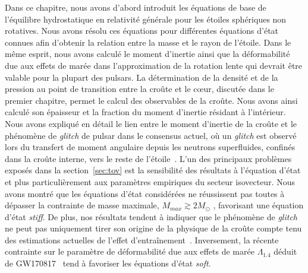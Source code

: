 Dans ce chapitre, nous avons d'abord introduit les équations de base de
l'équilibre hydrostatique en relativité générale pour les étoiles sphériques 
non rotatives. Nous avons résolu ces équations pour différentes équations 
d'état connues afin d'obtenir la relation entre la masse et le rayon de 
l'étoile. 
Dans le même esprit, nous avons calculé le moment d'inertie ainsi que la 
déformabilité due aux effets de marée dans l'approximation de la rotation 
lente qui devrait être valable pour la plupart des pulsars. 
La détermination de la densité et de la pression au point de transition entre
la croûte et le c\oe ur, discutée dans le premier chapitre, permet le calcul 
des observables de la croûte. Nous avons ainsi calculé son épaisseur et 
la fraction du moment d'inertie résidant à l'intérieur. Nous 
avons expliqué en détail le lien entre le moment d'inertie de la croûte et le 
phénomène de \textit{glitch} de pulsar dans le consensus actuel, où un 
\textit{glitch} est observé lors du transfert de moment angulaire depuis 
les neutrons superfluides, confinés dans la croûte interne, vers le reste de 
l'étoile~\cite{Anderson1975}. 
%
L'un des principaux problèmes exposés dans la section~\ref{sec:tov} est la 
sensibilité des résultats à l'équation d'état et plus particulièrement aux
paramètres empiriques du secteur isovecteur. Nous avons montré que les 
équations d'état considérées ne réussissent pas toutes à dépasser la 
contrainte de masse maximale, $M_{max} \gtrsim 
2M_\odot$ \cite{Demorest2010,Antoniadis2013,Cromartie2020}, favorisant une 
équation d'état \textit{stiff}. 
De plus, nos résultats tendent à indiquer que le phénomène de \textit{glitch} 
ne peut pas uniquement tirer son origine de la physique de la croûte compte 
tenu des estimations actuelles de l'effet 
d'entraînement~\cite{Andersson2012,Piekarewicz2014}.
Inversement, la récente contrainte sur le paramètre de déformabilité due aux
effets de marée $\Lambda_{1.4}$ déduit de GW170817~\cite{GW1} tend à favoriser 
les équations d'état \textit{soft}. 

